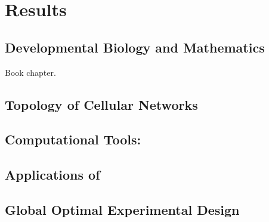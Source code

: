 \chapter{Results}
\section{Developmental Biology and Mathematics}
Book chapter.
\section{Topology of Cellular Networks}
\section{Computational Tools: \byo}
\section{Applications of \byo}
\section{Global Optimal Experimental Design}